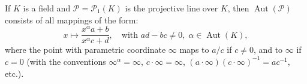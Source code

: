 If $K$ is a field and $\mathcal{P} = \mathcal{P}_1(K)$ is the projective line over $K$, then $\operatorname{Aut}(\mathcal{P})$ consists of all mappings of the form:
$$x \mapsto \frac{x^\alpha a + b}{x^\alpha c + d}, \quad \text{with } ad - bc \neq 0, \; \alpha \in \operatorname{Aut}(K),$$
where the point with parametric coordinate $\infty$ maps to $a/c$ if $c \neq 0$, and to $\infty$ if $c = 0$ (with the conventions $\infty^\alpha = \infty$, $c \cdot \infty = \infty$, $(a \cdot \infty)(c \cdot \infty)^{-1} = ac^{-1}$, etc.).
